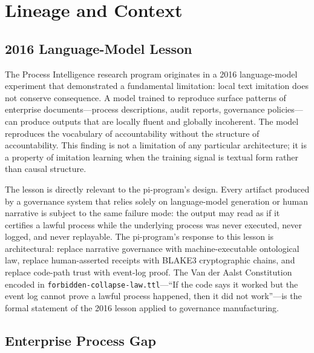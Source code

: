 
\section{Lineage and Context}
\label{sec:research-pi-program-lineage}

\subsection{2016 Language-Model Lesson}
\label{sec:research-pi-program-lineage-2016}

The Process Intelligence research program originates in a 2016 language-model experiment that demonstrated a fundamental limitation: local text imitation does not conserve consequence. A model trained to reproduce surface patterns of enterprise documents---process descriptions, audit reports, governance policies---can produce outputs that are locally fluent and globally incoherent. The model reproduces the vocabulary of accountability without the structure of accountability. This finding is not a limitation of any particular architecture; it is a property of imitation learning when the training signal is textual form rather than causal structure.

The lesson is directly relevant to the pi-program's design. Every artifact produced by a governance system that relies solely on language-model generation or human narrative is subject to the same failure mode: the output may read as if it certifies a lawful process while the underlying process was never executed, never logged, and never replayable. The pi-program's response to this lesson is architectural: replace narrative governance with machine-executable ontological law, replace human-asserted receipts with BLAKE3 cryptographic chains, and replace code-path trust with event-log proof. The Van der Aalst Constitution encoded in \texttt{forbidden-collapse-law.ttl}---``If the code says it worked but the event log cannot prove a lawful process happened, then it did not work''---is the formal statement of the 2016 lesson applied to governance manufacturing.

\subsection{Enterprise Process Gap}
\label{sec:research-pi-program-lineage-enterprise-gap}

